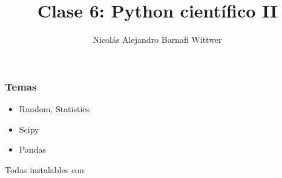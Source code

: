 \documentclass[14pt,aspectratio=169,xcolor=dvipsnames]{beamer}
\title[short title]{Clase 6: Python científico II}
\subtitle{}
\author[NA Barnafi] {Nicolás Alejandro Barnafi Wittwer}
\institute[UC|CMM] 
{
    Pontificia Universidad Católica de Chile \\
    Centro de Modelamiento Matemático
}
\date{}
\begin{document}
\begin{frame}
    \maketitle
\end{frame}
\begin{frame}\frametitle{Temas}
    \begin{itemize}
        \item Random, Statistics
        \item Scipy
        \item Pandas
    \end{itemize}

    \vspace{1cm}
    Todas instalables con 
\end{frame}
\end{document}

